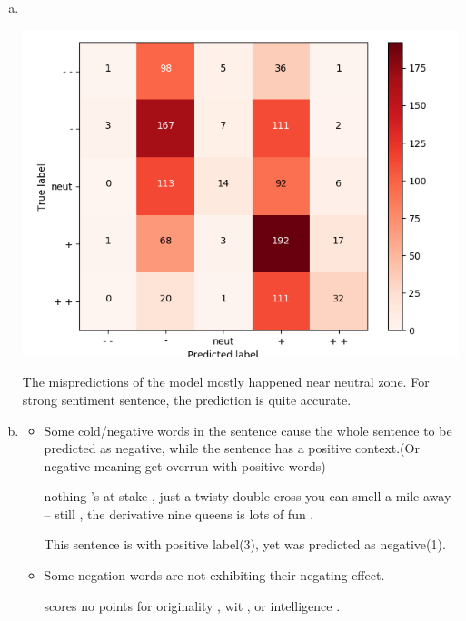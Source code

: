 \documentclass[11pt]{article}
\begin{document}
\begin{enumerate}[(a)]
\begin{center}
  \end{center}
  Regularization helped tackle overfitting, but regularization with too big
  weight harm the performance.
\item \ 
  \begin{center}
    \includegraphics[scale=.8]{../assignment1/q4_dev_conf.png}
  \end{center}
  The mispredictions of the model mostly happened near neutral zone. For strong
  sentiment sentence, the prediction is quite accurate.
\item
  \begin{itemize}
  \item Some cold/negative words in the sentence cause the whole sentence to be
    predicted as negative, while the sentence has a positive context.(Or
    negative meaning get overrun with positive words)
    \begin{center}
      \begin{varwidth}{.7\textwidth}
    {\small nothing 's at stake , just a twisty double-cross you can smell a mile away -- still , the derivative nine queens is lots of fun .}              
      \end{varwidth}
    \end{center}
    This sentence is with positive label(3), yet was predicted as negative(1).
\item Some negation words are not exhibiting their negating effect.
    \begin{center}
      \begin{varwidth}{.7\textwidth}
    {\small scores no points for originality , wit , or intelligence .}             

\end{varwidth}
\end{center}
\end{itemize}
\end{enumerate}
\end{document}
